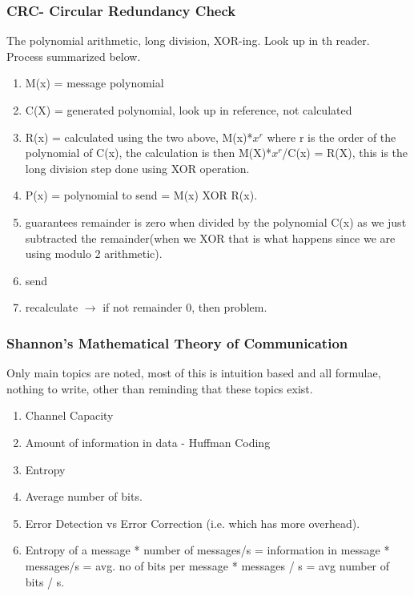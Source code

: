 \documentclass[11pt, a4paper]{article}
\begin{document}
\subsubsection{CRC- Circular Redundancy Check}
The polynomial arithmetic, long division, XOR-ing. Look up in th reader. Process summarized below.
\begin{enumerate}
    \item M(x) = message polynomial
    \item C(X) = generated polynomial, look up in reference, not calculated
    \item R(x) = calculated using the two above, M(x)*$x^{r}$ where r is the order of the polynomial of C(x), the calculation is then M(X)*$x^{r}$/C(x) = R(X), this is the long division step done using XOR operation.
    \item P(x) = polynomial to send = M(x) XOR R(x).
    \item guarantees remainder is zero when divided by the polynomial C(x) as we just subtracted the remainder(when we XOR that is what happens since we are using modulo 2 arithmetic).
    \item send
    \item recalculate $\to$ if not remainder 0, then problem.
\end{enumerate}
\subsubsection{Shannon's Mathematical Theory of Communication}
Only main topics are noted, most of this is intuition based and all formulae, nothing to write, other than reminding that these topics exist.
\begin{enumerate}
    \item Channel Capacity
    \item Amount of information in data - Huffman Coding
    \item Entropy
    \item Average number of bits.
    \item Error Detection vs Error Correction (i.e. which has more overhead).
    \item Entropy of a message * number of messages/s = information in message * messages/s = avg. no of bits per message * messages / s = avg number of bits / s.
\end{enumerate}
\end{document}
